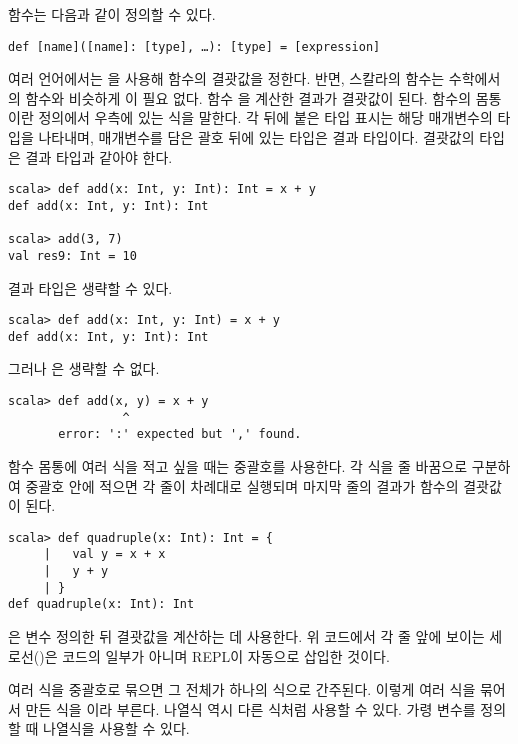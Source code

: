 함수는 다음과 같이 정의할 수 있다.

\begin{verbatim}
def [name]([name]: [type], …): [type] = [expression]
\end{verbatim}

여러 언어에서는 을 사용해 함수의 결괏값을 정한다. 반면,
스칼라의 함수는 수학에서의 함수와 비슷하게 이 필요 없다. 함수
을
계산한 결과가 결괏값이 된다. 함수의 몸통이란 정의에서 \code{=} 우측에 있는 식을 말한다.
각  뒤에 붙은 타입 표시는 해당 매개변수의 타입을 나타내며,
매개변수를 담은 괄호 뒤에 있는 타입은 결과 타입이다. 결괏값의
타입은 결과 타입과 같아야 한다.

\begin{verbatim}
scala> def add(x: Int, y: Int): Int = x + y
def add(x: Int, y: Int): Int

scala> add(3, 7)
val res9: Int = 10
\end{verbatim}

결과 타입은 생략할 수 있다.

\begin{verbatim}
scala> def add(x: Int, y: Int) = x + y
def add(x: Int, y: Int): Int
\end{verbatim}

그러나 은 생략할 수 없다.

\begin{verbatim}
scala> def add(x, y) = x + y
                ^
       error: ':' expected but ',' found.
\end{verbatim}

함수 몸통에 여러 식을 적고 싶을 때는 중괄호를 사용한다. 각 식을 줄 바꿈으로
구분하여 중괄호 안에 적으면 각 줄이 차례대로 실행되며 마지막 줄의 결과가 함수의
결괏값이 된다.

\begin{verbatim}
scala> def quadruple(x: Int): Int = {
     |   val y = x + x
     |   y + y
     | }
def quadruple(x: Int): Int
\end{verbatim}

은 변수  정의한 뒤 결괏값을 계산하는 데  사용한다. 위 코드에서 각
줄 앞에 보이는 세로선(\code{|})은 코드의 일부가 아니며 REPL이 자동으로 삽입한 것이다.

여러 식을 중괄호로 묶으면 그 전체가 하나의 식으로 간주된다. 이렇게 여러 식을
묶어서 만든 식을 이라 부른다. 나열식 역시 다른
식처럼 사용할 수 있다. 가령 변수를 정의할 때 나열식을 사용할 수 있다.

